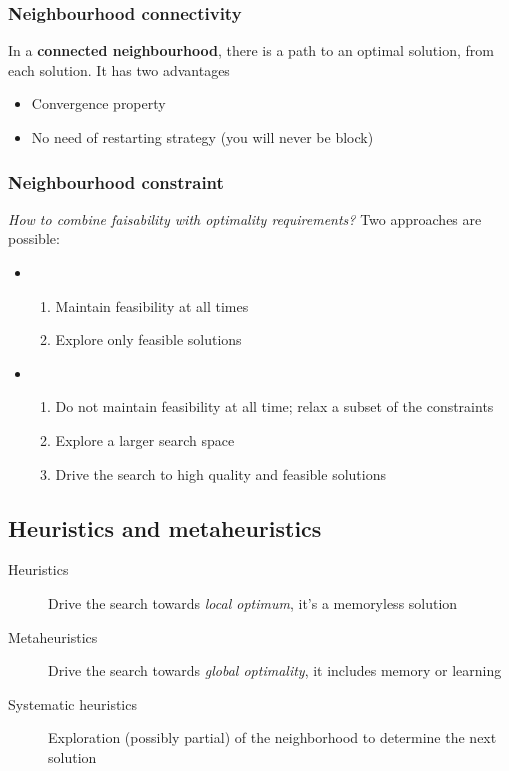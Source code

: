 \subsubsection{Neighbourhood connectivity}

In a \textbf{connected neighbourhood}, there is a path to an optimal solution, from each solution. It has two advantages
\begin{itemize}
\item Convergence property
\item No need of restarting strategy (you will never be block)
\end{itemize}

\subsubsection{Neighbourhood constraint}

\textit{How to combine faisability with optimality requirements?} Two approaches are possible:
\begin{itemize}
\item
	\begin{enumerate}
	\item Maintain feasibility at all times
	\item Explore only feasible solutions
	\end{enumerate}
\item 
	\begin{enumerate}
	\item Do not maintain feasibility at all time; relax a subset of the constraints
	\item Explore a larger search space
	\item Drive the search to high quality and feasible solutions
	\end{enumerate}
\end{itemize}

\subsection{Heuristics and metaheuristics}

\begin{description}
\item[Heuristics] Drive the search towards \textit{local optimum}, it's a memoryless solution
\item[Metaheuristics] Drive the search towards \textit{global optimality}, it includes memory or learning
\item[Systematic heuristics] Exploration (possibly partial) of the neighborhood to determine the next solution
\end{description}

